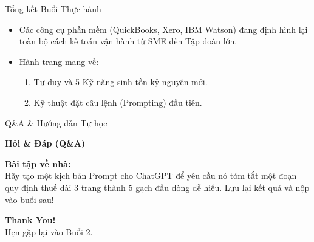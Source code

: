 \documentclass[aspectratio=169]{beamer}
\begin{document}
\begin{frame}{Tổng kết Buổi Thực hành}
    \begin{itemize}
        \item Các công cụ phần mềm (QuickBooks, Xero, IBM Watson) đang định hình lại toàn bộ cách kế toán vận hành từ SME đến Tập đoàn lớn.
        \item Hành trang mang về: 
        \begin{enumerate}
            \item Tư duy và 5 Kỹ năng sinh tồn kỷ nguyên mới.
            \item Kỹ thuật đặt câu lệnh (Prompting) đầu tiên.
        \end{enumerate}
    \end{itemize}
\end{frame}

\begin{frame}{Q\&A \& Hướng dẫn Tự học}
    \begin{center}
        \Large \textbf{Hỏi \& Đáp (Q\&A)}
    \end{center}
    \vspace{0.5cm}
    \textbf{Bài tập về nhà:} \\
    Hãy tạo một kịch bản Prompt cho ChatGPT để yêu cầu nó tóm tắt một đoạn quy định thuế dài 3 trang thành 5 gạch đầu dòng dễ hiểu. 
    Lưu lại kết quả và nộp vào buổi sau!
\end{frame}

\begin{frame}
    \begin{center}
        \Huge \textbf{Thank You!} \\
        \vspace{1cm}
        \normalsize Hẹn gặp lại vào Buổi 2.
    \end{center}
\end{frame}
\end{document}
